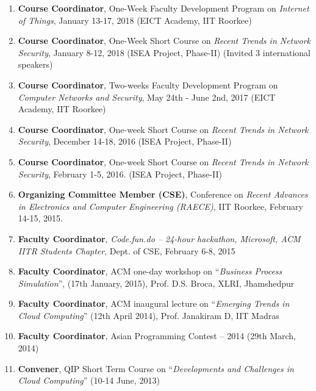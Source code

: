 \begin{enumerate} %

\item
\textbf{Course Coordinator}, One-Week Faculty Development Program on \textit{Internet of Things}, January 13-17, 2018 (EICT Academy, IIT Roorkee)

\item
\textbf{Course Coordinator}, One-Week Short Course on \textit{Recent Trends in Network Security}, January 8-12, 2018 (ISEA Project, Phase-II) (Invited 3 international speakers)

\item
\textbf{Course Coordinator}, Two-weeks Faculty Development Program on \textit{Computer Networks and Security}, May 24th - June 2nd, 2017 (EICT Academy, IIT Roorkee)

\item
\textbf{Course Coordinator}, One-week Short Course on \textit{Recent Trends in Network Security}, December 14-18, 2016 (ISEA Project, Phase-II)

\item
\textbf{Course Coordinator}, One-week Short Course on \textit{Recent Trends in Network Security}, February 1-5, 2016. (ISEA Project, Phase-II)

\item
\textbf{Organizing Committee Member (CSE)}, Conference on \textit{Recent Advances in Electronics and Computer Engineering (RAECE)}, IIT Roorkee, February 14-15, 2015.

\item
\textbf{Faculty Coordinator}, \textit{Code.fun.do – 24-hour hackathon, Microsoft, ACM IITR Students Chapter}, Dept. of CSE, February 6-8, 2015

\item
\textbf{Faculty Coordinator}, ACM one-day workshop on “\textit{Business Process Simulation}”, (17th January, 2015), Prof. D.S. Broca, XLRI, Jhamshedpur

\item
\textbf{Faculty Coordinator}, ACM inaugural lecture on “\textit{Emerging Trends in Cloud Computing}” (12th April 2014), Prof. Janakiram D, IIT Madras 

\item
\textbf{Faculty Coordinator}, Asian Programming Contest – 2014 (29th March, 2014)

\item
\textbf{Convener}, QIP Short Term Course on “\textit{Developments and Challenges in Cloud Computing}” (10-14 June, 2013)


\end{enumerate}
